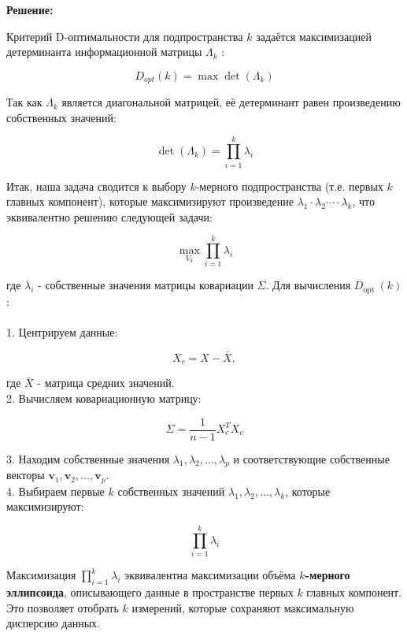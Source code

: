 \textbf{Решение:}

Критерий D-оптимальности для подпространства $k$ задаётся максимизацией детерминанта информационной матрицы $\Lambda_k$ :

$$
D_{o p t}(k)=\max \operatorname{det}\left(\Lambda_k\right)
$$

Так как $\Lambda_k$ является диагональной матрицей, её детерминант равен произведению собственных значений:

$$
\operatorname{det}\left(\Lambda_k\right)=\prod_{i=1}^k \lambda_i
$$

Итак, наша задача сводится к выбору $k$-мерного подпространства (т.е. первых $k$ главных компонент), которые максимизируют произведение $\lambda_1 \cdot \lambda_2 \cdots \cdot \lambda_k$, что эквивалентно решению следующей задачи:

$$
\max _{V_k} \prod_{i=1}^k \lambda_i
$$


где $\lambda_i$ - собственные значения матрицы ковариации $\Sigma$.
Для вычисления $D_{\text {opt }}(k)$ :\\
\\
1. Центрируем данные:

$$
X_c=X-\bar{X},
$$


где $\bar{X}$ - матрица средних значений.\\
2. Вычисляем ковариационную матрицу:

$$
\Sigma=\frac{1}{n-1} X_c^T X_c
$$

3. Находим собственные значения $\lambda_1, \lambda_2, \ldots, \lambda_p$ и соответствующие собственные векторы $\mathbf{v}_1, \mathbf{v}_2, \ldots, \mathbf{v}_p$.\\
4. Выбираем первые $k$ собственных значений $\lambda_1, \lambda_2, \ldots, \lambda_k$, которые максимизируют:

$$
\prod_{i=1}^k \lambda_i
$$


Максимизация $\prod_{i=1}^k \lambda_i$ эквивалентна максимизации объёма \textbf{$k$-мерного эллипсоида}, описывающего данные в пространстве первых $k$ главных компонент. Это позволяет отобрать $k$ измерений, которые сохраняют максимальную дисперсию данных.

